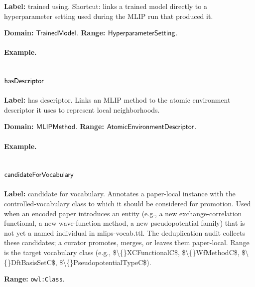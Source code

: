 \textbf{Label:} trained using.
Shortcut: links a trained model directly to a hyperparameter setting used during the MLIP run that produced it.

\textbf{Domain:} $\mathsf{TrainedModel}$.
\textbf{Range:} $\mathsf{HyperparameterSetting}$.

\paragraph{Example.}

\subsection{$\mathsf{hasDescriptor}$}
\label{sec:term-hasDescriptor}

\textbf{Label:} has descriptor.
Links an MLIP method to the atomic environment descriptor it uses to represent local neighborhoods.

\textbf{Domain:} $\mathsf{MLIPMethod}$.
\textbf{Range:} $\mathsf{AtomicEnvironmentDescriptor}$.

\paragraph{Example.}

\subsection{$\mathsf{candidateForVocabulary}$}
\label{sec:term-candidateForVocabulary}

\textbf{Label:} candidate for vocabulary.
Annotates a paper-local instance with the controlled-vocabulary class to which it should be considered for promotion. Used when an encoded paper introduces an entity (e.g., a new exchange-correlation functional, a new wave-function method, a new pseudopotential family) that is not yet a named individual in mlips-vocab.ttl. The deduplication audit collects these candidates; a curator promotes, merges, or leaves them paper-local. Range is the target vocabulary class (e.g., \$\textbackslash\{\}XCFunctionalC\$, \$\textbackslash\{\}WfMethodC\$, \$\textbackslash\{\}DftBasisSetC\$, \$\textbackslash\{\}PseudopotentialTypeC\$).

\textbf{Range:} \texttt{owl:Class}.

